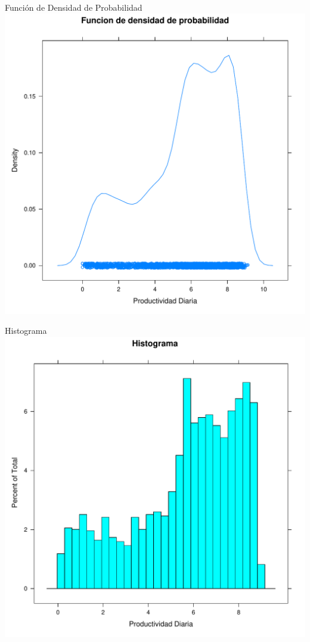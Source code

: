 \documentclass[xcolor={usenames,svgnames,dvipsnames}]{beamer}
\begin{document}
\begin{frame}[label=sec-7-2-1]{Función de Densidad de Probabilidad}
\includegraphics[width=.9\linewidth]{../figs/FuncionDensidadProbabilidad.pdf}
\end{frame}

\begin{frame}[label=sec-7-2-2]{Histograma}
\includegraphics[width=.9\linewidth]{../figs/Histograma.pdf}
\end{frame}
\end{document}
